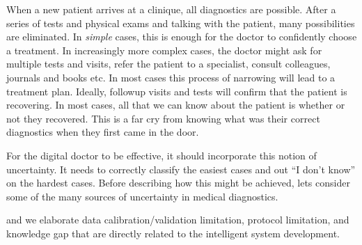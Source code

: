 \documentclass[11pt]{pnas-new}
\begin{document}

When a new patient arrives at a clinique, all diagnostics are
possible. After a {\color{blue}series of tests and} physical exams and talking with the patient, many
possibilities are eliminated. In {\em simple} cases, this is enough
for the doctor to confidently choose a treatment. In increasingly more complex
cases, the doctor might ask for multiple tests and visits, refer the
patient to a specialist, consult colleagues, journals and books
etc. In most cases this process of narrowing will lead to a treatment
plan. Ideally, followup visits and tests will confirm that the patient
is recovering. In most cases, all that we can know about the patient
is whether or not they recovered. This is a far cry from knowing what
was their correct diagnostics when they first came in the door.

For the digital doctor to be effective, it should incorporate this
notion of uncertainty. It needs to correctly classify the easiest cases
and out ``I don't know'' on the hardest cases. Before describing how
this might be achieved, lets consider some of the many sources of
uncertainty in medical diagnostics.

\iffalse
and we elaborate data calibration/validation limitation, protocol limitation, and knowledge gap that are directly related to the intelligent system development. 
\end{document}
